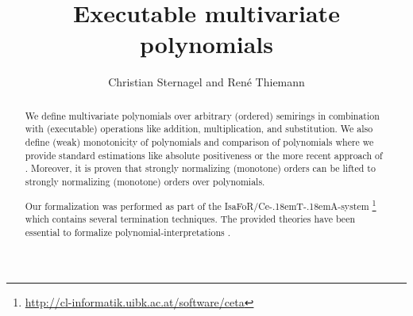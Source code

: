 \documentclass[11pt,a4paper]{article}
\newcommand\isafor{\textsf{IsaFoR}}
\newcommand\ceta{\textsf{Ce\kern-.18emT\kern-.18emA}}
\begin{document}
\title{Executable multivariate polynomials}
\author{Christian Sternagel and Ren\'e Thiemann}
\maketitle

\begin{abstract}
  We define multivariate polynomials over arbitrary (ordered)
  semirings in combination with (executable) operations like addition, multiplication,
  and substitution. We also define (weak) monotonicity of polynomials
  and comparison of polynomials where we provide standard estimations 
  like absolute positiveness or the more recent
  approach of \cite{NZM10}. Moreover, it is proven
  that strongly normalizing (monotone) orders 
  can be lifted to strongly normalizing (monotone) orders over polynomials. 
   
  Our formalization was performed as part of the \isafor/\ceta-system 
  \cite{CeTA}\footnote{\url{http://cl-informatik.uibk.ac.at/software/ceta}}
  which
  contains several termination techniques. The provided theories have been
  essential to formalize polynomial-interpretations \cite{L79,Rational}.
\end{abstract}

\tableofcontents








\end{document}
